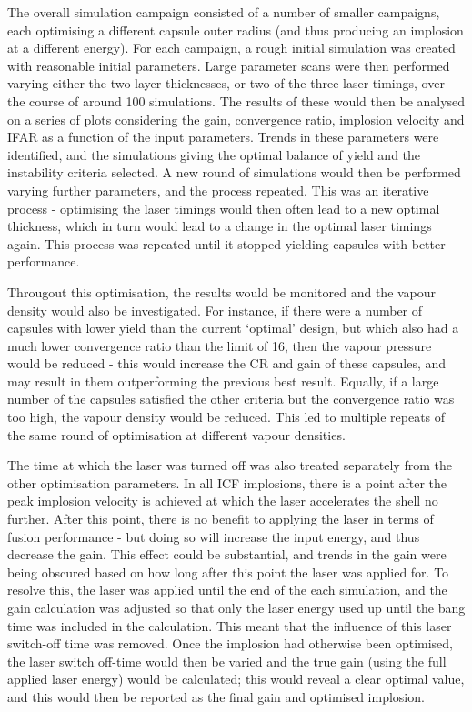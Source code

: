 The overall simulation campaign consisted of a number of smaller campaigns, each optimising a different capsule outer radius (and thus producing an implosion at a different energy). For each campaign, a rough initial simulation was created with reasonable initial parameters. Large parameter scans were then performed varying either the two layer thicknesses, or two of the three laser timings, over the course of around 100 simulations. The results of these would then be analysed on a series of plots considering the gain, convergence ratio, implosion velocity and IFAR as a function of the input parameters. Trends in these parameters were identified, and the simulations giving the optimal balance of yield and the instability criteria selected. A new round of simulations would then be performed varying further parameters, and the process repeated. This was an iterative process - optimising the laser timings would then often lead to a new optimal thickness, which in turn would lead to a change in the optimal laser timings again. This process was repeated until it stopped yielding capsules with better performance.

Througout this optimisation, the results would be monitored and the vapour density would also be investigated. For instance, if there were a number of capsules with lower yield than the current `optimal' design, but which also had a much lower convergence ratio than the limit of 16, then the vapour pressure would be reduced - this would increase the CR and gain of these capsules, and may result in them outperforming the previous best result. Equally, if a large number of the capsules satisfied the other criteria but the convergence ratio was too high, the vapour density would be reduced. This led to multiple repeats of the same round of optimisation at different vapour densities.

The time at which the laser was turned off was also treated separately from the other optimisation parameters. In all ICF implosions, there is a point after the peak implosion velocity is achieved at which the laser accelerates the shell no further. After this point, there is no benefit to applying the laser in terms of fusion performance - but doing so will increase the input energy, and thus decrease the gain. This effect could be substantial, and trends in the gain were being obscured based on how long after this point the laser was applied for. To resolve this, the laser was applied until the end of the each simulation, and the gain calculation was adjusted so that only the laser energy used up until the bang time was included in the calculation. This meant that the influence of this laser switch-off time was removed. Once the implosion had otherwise been optimised, the laser switch off-time would then be varied and the true gain (using the full applied laser energy) would be calculated; this would reveal a clear optimal value, and this would then be reported as the final gain and optimised implosion.

